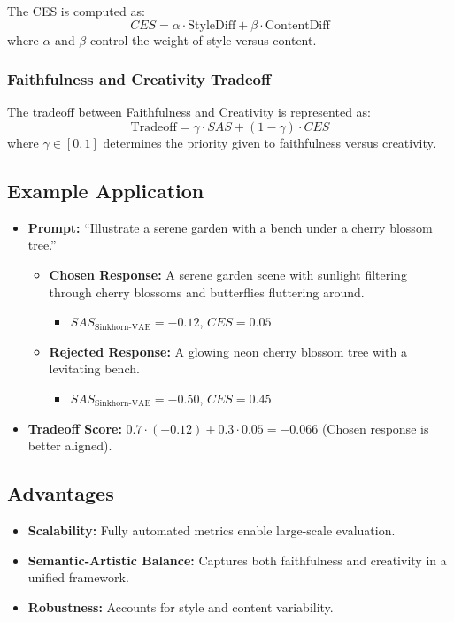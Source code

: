 The CES is computed as:
\begin{equation}
CES = \alpha \cdot \text{StyleDiff} + \beta \cdot \text{ContentDiff}
\end{equation}
where $\alpha$ and $\beta$ control the weight of style versus content.

\subsubsection{Faithfulness and Creativity Tradeoff}
The tradeoff between Faithfulness and Creativity is represented as:
\begin{equation}
\text{Tradeoff} = \gamma \cdot SAS + (1 - \gamma) \cdot CES
\end{equation}
where $\gamma \in [0,1]$ determines the priority given to faithfulness versus creativity.

\subsection{Example Application}
\begin{itemize}
    \item \textbf{Prompt:} “Illustrate a serene garden with a bench under a cherry blossom tree.”
    \begin{itemize}
        \item \textbf{Chosen Response:} A serene garden scene with sunlight filtering through cherry blossoms and butterflies fluttering around. 
        \begin{itemize}
            \item $SAS_{\text{Sinkhorn-VAE}} = -0.12$, $CES = 0.05$
        \end{itemize}
        \item \textbf{Rejected Response:} A glowing neon cherry blossom tree with a levitating bench.
        \begin{itemize}
            \item $SAS_{\text{Sinkhorn-VAE}} = -0.50$, $CES = 0.45$
        \end{itemize}
    \end{itemize}
    \item \textbf{Tradeoff Score:} $0.7 \cdot (-0.12) + 0.3 \cdot 0.05 = -0.066$ (Chosen response is better aligned).
\end{itemize}

\subsection{Advantages}
\begin{itemize}
    \item \textbf{Scalability:} Fully automated metrics enable large-scale evaluation.
    \item \textbf{Semantic-Artistic Balance:} Captures both faithfulness and creativity in a unified framework.
    \item \textbf{Robustness:} Accounts for style and content variability.
\end{itemize}


